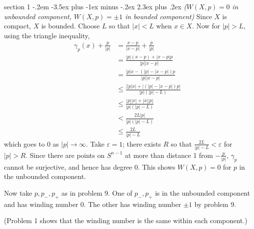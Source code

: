 \documentclass[12pt]{article}
\makeatletter
\theoremstyle{norm}
\newcommand{\ga}[0]{\gamma}
\newcommand{\ep}[0]{\varepsilon}
\newcommand{\ab}[1]{\left| {#1} \right|}
\newcommand{\iy}[0]{\infty}
\newenvironment{problem}{\@startsection
       {section}
       {1}
       {-.2em}
       {-3.5ex plus -1ex minus -.2ex}
       {2.3ex plus .2ex}
       {\pagebreak[3]%
       \large\bf\noindent{Problem }
       }
       }
       {%
       }
\makeatother
\begin{document}
\begin{problem}{\it($W(X,p)=0$ in unbounded component, $W(X,p)=\pm 1$ in bounded component)}
Since $X$ is compact, $X$ is bounded. Choose $L$ so that $|x|<L$ when $x\in X$. 
Now for $|p|>L$, using the triangle inequality,
\begin{align*}
\ga_p(x)+\frac{p}{|p|}&=\frac{x-p}{|x-p|}+\frac{p}{|p|}\\
&=\frac{|p|(x-p)+|x-p|p}{|p||x-p|}\\
&=\frac{|p|x-(|p|-|x-p|)p}{|p||x-p|}\\
&\le\frac{\ab{|p|x}+\ab{(|p|-|x-p|)p}}{|p|(|p|-L)}\\
&\le \frac{|p||x|+|x||p|}{|p|(|p|-L)}\\
&< \frac{2L|p|}{|p|(|p|-L)}\\
&\le \frac{2L}{|p|-L}
\end{align*}
which goes to 0 as $|p|\to \iy$. Take $\ep=1$; there exists $R$ so that $\frac{2L}{|p|-L}<\ep$ for $|p|>R$. 
Since there are points on $S^{n-1}$ at more than distance 1 from $-\frac{p}{|p|}$, $\ga_p$ cannot be surjective, and hence has degree 0. This shows $W(X,p)=0$ for $p$ in the unbounded component.

Now take $p,p_-,p_+$ as in problem 9. One of $p_-,p_+$ is in the unbounded component and has winding number 0. The other has winding number $\pm1$ by problem 9.

(Problem 1 shows that the winding number is the same within each component.)
\end{problem}

\end{document}
